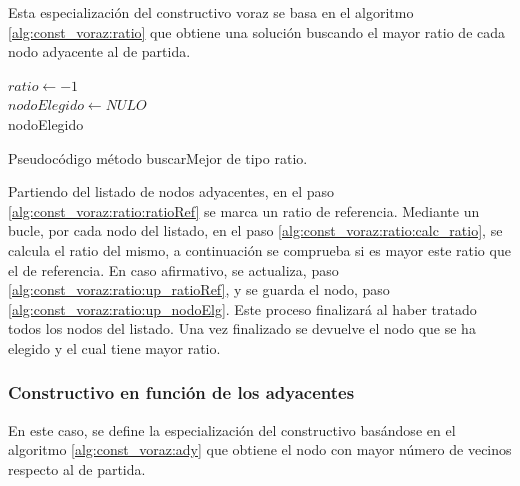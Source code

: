 Esta especialización del constructivo voraz se basa en el algoritmo \ref{alg:const_voraz:ratio} que obtiene una solución buscando el mayor ratio de cada nodo adyacente al de partida.

\begin{algorithm}[H]
	$ ratio \gets -1 $ \label{alg:const_voraz:ratio:ratioRef} \\[0.2cm]
	$ nodoElegido \gets NULO $ \label{alg:const_voraz:ratio:nodoElg} \\[0.2cm]
	\Return nodoElegido \label{alg:const_voraz:ratio:rt_nodoElg}
	\caption{Pseudocódigo método buscarMejor de tipo ratio.}
	\label{alg:const_voraz:ratio}
\end{algorithm}

Partiendo del listado de nodos adyacentes, en el paso \ref{alg:const_voraz:ratio:ratioRef} se marca un ratio de referencia. Mediante un bucle, por cada nodo del listado, en el paso \ref{alg:const_voraz:ratio:calc_ratio}, se calcula el ratio del mismo, a continuación se comprueba si es mayor este ratio que el de referencia. En caso afirmativo, se actualiza, paso \ref{alg:const_voraz:ratio:up_ratioRef}, y se guarda el nodo, paso \ref{alg:const_voraz:ratio:up_nodoElg}. Este proceso finalizará al haber tratado todos los nodos del listado. Una vez finalizado se devuelve el nodo que se ha elegido y el cual tiene mayor ratio.

\subsubsection{Constructivo en función de los adyacentes}
\label{sec:const_ady}

En este caso, se define la especialización del constructivo basándose en el algoritmo \ref{alg:const_voraz:ady} que obtiene el nodo con mayor número de vecinos respecto al de partida.

